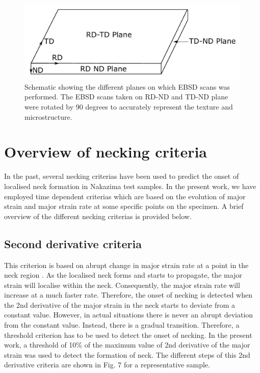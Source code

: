 \documentclass[11pt]{article} %
\begin{document}
\begin{figure}[h]
	\includegraphics[width=\textwidth]{figures/sample_orientations}
	\centering
	\caption{Schematic showing the different planes on which EBSD scans was performed. The EBSD scans taken on RD-ND and TD-ND plane were rotated by 90 degrees to accurately represent the texture and microstructure.}
	\label{fig:orientations}
\end{figure}


\section{Overview of necking criteria}
In the past, several necking criterias have been used to predict the onset of localised neck formation in Nakazima test samples. In the present work, we have employed time dependent criterias which are based on the evolution of major strain and major strain rate at some specific points on the specimen. A brief overview of the different necking criterias is provided below.

\subsection{Second derivative criteria}
This criterion is based on abrupt change in major strain rate at a point in the neck region \cite{Song2019}. As the localised neck forms and starts to propagate, the major strain will localise within the neck. Consequently, the major strain rate will increase at a much faster rate. Therefore, the onset of necking is detected when the 2nd derivative of the major strain in the neck starts to deviate from a constant value.  However, in actual situations there is never an abrupt deviation from the constant value. Instead, there is a gradual transition. Therefore, a threshold criterion has to be used to detect the onset of necking. In the present work, a threshold of 10\% of the maximum value of 2nd derivative of the major strain was used to detect the formation of neck. The different steps of this 2nd derivative criteria are shown in Fig. 7 for a representative sample. 
\end{document}
